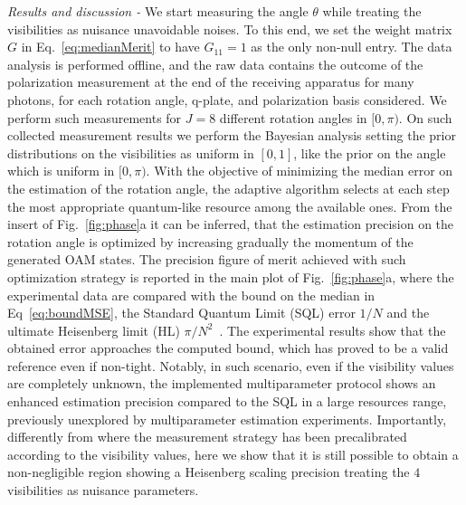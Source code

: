 \documentclass[aps,pra,twocolumn,notitlepage,superscriptaddress]{revtex4-1}
\begin{document}
\emph{Results and discussion -}
%
We start measuring the angle $\theta$ while treating the visibilities as nuisance unavoidable noises. To this end, we set the weight matrix $G$ in Eq.~\eqref{eq:medianMerit} to have $G_{11} = 1$ as the only non-null entry. The data analysis is performed offline, and the raw data contains the outcome of the polarization measurement at the end of the receiving apparatus for many photons, for each rotation angle, q-plate, and polarization basis considered. We perform such measurements for $J=8$ different rotation angles in $[0, \pi)$. On such collected measurement results we perform the Bayesian analysis setting the prior distributions on the visibilities as uniform in $[0, 1]$, like the prior on the angle which is uniform in $[0, \pi)$. With the objective of minimizing the median error on the estimation of the rotation angle, the adaptive algorithm selects at each step the most appropriate quantum-like resource among the available ones. From the insert of Fig.~\ref{fig:phase}a it can be inferred, that the estimation precision on the rotation angle is optimized by increasing gradually the momentum of the generated OAM states. The precision figure of merit achieved with such optimization strategy is reported in the main plot of Fig.~\ref{fig:phase}a, where the experimental data are compared with the bound on the median in Eq~\eqref{eq:boundMSE}, the Standard Quantum Limit (SQL) error $1/N$ and the ultimate Heisenberg limit (HL) $\pi/N^2$~\cite{PhysRevLett.124.030501}. The experimental results show that the obtained error approaches the computed bound, which has proved to be a valid reference even if non-tight. Notably, in such scenario, even if the visibility values are completely unknown, the implemented multiparameter protocol shows an enhanced estimation precision compared to the SQL in a large resources range, previously unexplored by multiparameter estimation experiments. Importantly, differently from \cite{cimini2021non} where the measurement strategy has been precalibrated according to the visibility values, here we show that it is still possible to obtain a non-negligible region showing a Heisenberg scaling precision treating the $4$ visibilities as nuisance parameters. 
%
\end{document}
